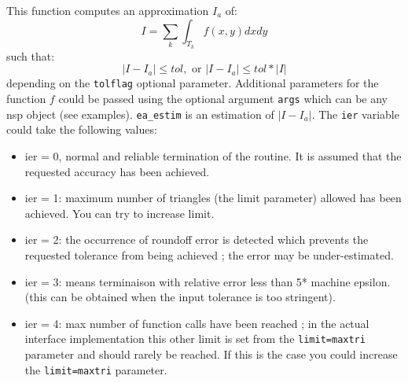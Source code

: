 \begin{mandescription}
This function computes an approximation $I_a$ of:
$$
   I = \sum_k \int_{T_k} f(x,y) dxdy
$$
such that:
$$
   | I - I_a | \le  tol, \mbox{ or } | I - I_a | \le  tol*|I|
$$
depending on the \verb+tolflag+ optional parameter.
Additional parameters for the function $f$ could be passed using the
optional argument \verb+args+ which can be any nsp object (see
examples). \verb+ea_estim+ is an estimation of $| I - I_a |$. The
\verb+ier+ variable could take the following values: 
\begin{itemize}
\item ier = 0,  normal and reliable termination of the routine. It is assumed that the
      requested  accuracy has been achieved.
\item ier = 1: maximum number of triangles (the limit
      parameter) allowed has been achieved. You can try to
      increase limit.
\item ier = 2: the occurrence of roundoff error is detected
      which prevents the requested tolerance from being
      achieved ; the error may be under-estimated.
\item ier = 3: means terminaison with relative error less than 5* machine epsilon.
      (this can be obtained when the input tolerance is too stringent).
\item ier = 4: max number of function calls have been reached ;
      in the actual interface implementation this other limit is set
      from the \verb+limit=maxtri+ parameter and should rarely be
      reached. If this is the case you could increase the
      \verb+limit=maxtri+ parameter.
\end{itemize}

\end{mandescription}

